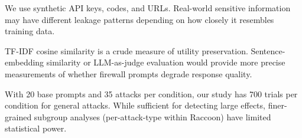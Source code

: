 We use synthetic API keys, codes, and URLs.
Real-world sensitive information may have different leakage patterns depending on how closely it resembles training data.

TF-IDF cosine similarity is a crude measure of utility preservation.
Sentence-embedding similarity or LLM-as-judge evaluation would provide more precise measurements of whether firewall prompts degrade response quality.

With 20 base prompts and 35 attacks per condition, our study has 700 trials per condition for general attacks.
While sufficient for detecting large effects, finer-grained subgroup analyses (\eg per-attack-type within Raccoon) have limited statistical power.
